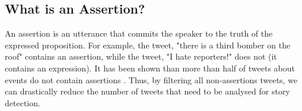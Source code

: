 \documentclass[letterpaper]{article}
\begin{document}



\subsection{What is an Assertion?}
An assertion is an utterance that commits the speaker to the truth of the expressed proposition. For example, the tweet, "there is a third bomber on the roof" contains an assertion, while the tweet, "I hate reporters!" does not (it contains an expression). %
It has been shown than more than half of tweets about events do not contain assertions \cite{vosoughi_act_2016}. Thus, by filtering all non-assertions tweets, we can drastically reduce the number of tweets that need to be analysed for story detection.





\end{document}
